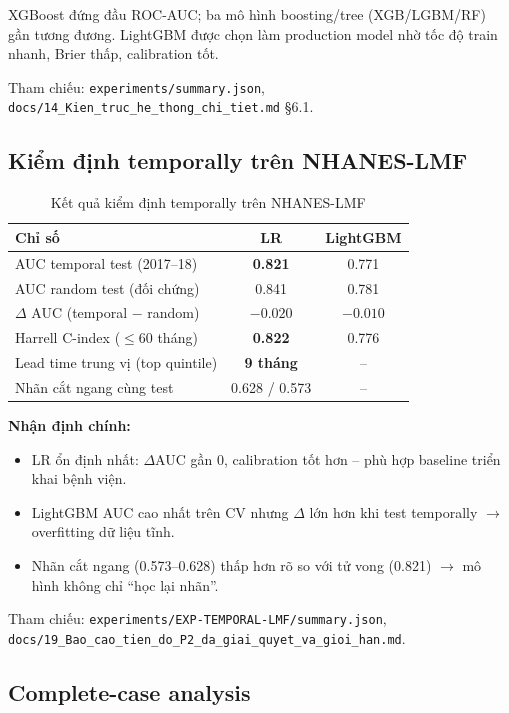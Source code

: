 \documentclass[13pt,a4paper]{article}
\begin{document}
XGBoost đứng đầu ROC-AUC; ba mô hình boosting/tree (XGB/LGBM/RF) gần tương đương. LightGBM được chọn làm production model nhờ tốc độ train nhanh, Brier thấp, calibration tốt.

Tham chiếu: \texttt{experiments/summary.json}, \texttt{docs/14\_Kien\_truc\_he\_thong\_chi\_tiet.md} §6.1.

\subsection{Kiểm định temporally trên NHANES-LMF}

\begin{table}[H]
\centering
\caption{Kết quả kiểm định temporally trên NHANES-LMF}
\label{tab:temporal}
\begin{tabular}{lcc}
\toprule
Chỉ số & LR & LightGBM \\
\midrule
AUC temporal test (2017--18) & \textbf{0.821} & 0.771 \\
AUC random test (đối chứng) & 0.841 & 0.781 \\
$\Delta$ AUC (temporal $-$ random) & $-0.020$ & $-0.010$ \\
Harrell C-index ($\le$60 tháng) & \textbf{0.822} & 0.776 \\
Lead time trung vị (top quintile) & \textbf{9 tháng} & -- \\
Nhãn cắt ngang cùng test & 0.628 / 0.573 & -- \\
\bottomrule
\end{tabular}
\end{table}

\textbf{Nhận định chính:}

\begin{itemize}
    \item LR ổn định nhất: $\Delta$AUC gần 0, calibration tốt hơn -- phù hợp baseline triển khai bệnh viện.
    \item LightGBM AUC cao nhất trên CV nhưng $\Delta$ lớn hơn khi test temporally $\to$ overfitting dữ liệu tĩnh.
    \item Nhãn cắt ngang (0.573--0.628) thấp hơn rõ so với tử vong (0.821) $\to$ mô hình không chỉ ``học lại nhãn''.
\end{itemize}

Tham chiếu: \texttt{experiments/EXP-TEMPORAL-LMF/summary.json}, \texttt{docs/19\_Bao\_cao\_tien\_do\_P2\_da\_giai\_quyet\_va\_gioi\_han.md}.

\subsection{Complete-case analysis}
\end{document}
